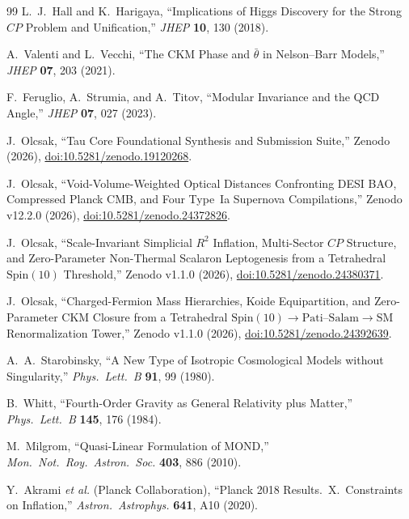 \documentclass[11pt,a4paper]{article}
\begin{document}
\begin{thebibliography}{99}
L.~J.~Hall and K.~Harigaya, ``Implications of Higgs Discovery for the Strong $CP$ Problem and Unification,'' \emph{JHEP} \textbf{10}, 130 (2018).

A.~Valenti and L.~Vecchi, ``The CKM Phase and $\bar{\theta}$ in Nelson--Barr Models,'' \emph{JHEP} \textbf{07}, 203 (2021).

F.~Feruglio, A.~Strumia, and A.~Titov, ``Modular Invariance and the QCD Angle,'' \emph{JHEP} \textbf{07}, 027 (2023).

J.~Olcsak, ``Tau Core Foundational Synthesis and Submission Suite,'' Zenodo (2026), \href{https://doi.org/10.5281/zenodo.19120268}{doi:10.5281/zenodo.19120268}.

J.~Olcsak, ``Void-Volume-Weighted Optical Distances Confronting DESI BAO, Compressed Planck CMB, and Four Type~Ia Supernova Compilations,'' Zenodo v12.2.0 (2026), \href{https://doi.org/10.5281/zenodo.24372826}{doi:10.5281/zenodo.24372826}.

J.~Olcsak, ``Scale-Invariant Simplicial $R^2$ Inflation, Multi-Sector $CP$ Structure, and Zero-Parameter Non-Thermal Scalaron Leptogenesis from a Tetrahedral $\mathrm{Spin}(10)$ Threshold,'' Zenodo v1.1.0 (2026), \href{https://doi.org/10.5281/zenodo.24380371}{doi:10.5281/zenodo.24380371}.

J.~Olcsak, ``Charged-Fermion Mass Hierarchies, Koide Equipartition, and Zero-Parameter CKM Closure from a Tetrahedral $\mathrm{Spin}(10) \to \mathrm{Pati\text{--}Salam} \to \mathrm{SM}$ Renormalization Tower,'' Zenodo v1.1.0 (2026), \href{https://doi.org/10.5281/zenodo.24392639}{doi:10.5281/zenodo.24392639}.

A.~A.~Starobinsky, ``A New Type of Isotropic Cosmological Models without Singularity,'' \emph{Phys.\ Lett.\ B} \textbf{91}, 99 (1980).

B.~Whitt, ``Fourth-Order Gravity as General Relativity plus Matter,'' \emph{Phys.\ Lett.\ B} \textbf{145}, 176 (1984).

M.~Milgrom, ``Quasi-Linear Formulation of MOND,'' \emph{Mon.\ Not.\ Roy.\ Astron.\ Soc.} \textbf{403}, 886 (2010).

Y.~Akrami \textit{et al.} (Planck Collaboration), ``Planck 2018 Results.\ X.\ Constraints on Inflation,'' \emph{Astron.\ Astrophys.} \textbf{641}, A10 (2020).


\end{thebibliography}
\end{document}
